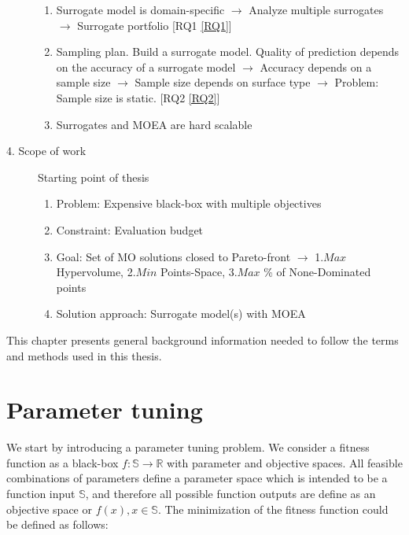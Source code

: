 \begin{blockquote}
\begin{description}
\begin{enumerate}
                    \item Surrogate model is domain-specific $\rightarrow$ Analyze multiple surrogates $\rightarrow$ Surrogate portfolio [RQ1 \ref{RQ1}]
                    \item Sampling plan. Build a surrogate model. Quality of prediction depends on the accuracy of a surrogate model  $\rightarrow$ Accuracy depends on a sample size $\rightarrow$ Sample size depends on surface type $\rightarrow$ Problem: Sample size is static. [RQ2 \ref{RQ2}]
                    \item Surrogates and MOEA are hard scalable 
                \end{enumerate}
            \item[4. Scope of work] Starting point of thesis
                \begin{enumerate}
                    \item Problem: Expensive black-box with multiple objectives
                    \item Constraint: Evaluation budget
                    \item Goal: Set of MO solutions closed to Pareto-front $\rightarrow$ 1.$Max$ Hypervolume, 2.$Min$ Points-Space, 3.$Max$ \% of None-Dominated points 
                    \item Solution approach: Surrogate model(s) with MOEA
                \end{enumerate}
        \end{description}
    \end{blockquote}

    This chapter presents general background information needed to follow the terms and methods used in this thesis. 

    \section{Parameter tuning}
        We start by introducing a parameter tuning problem. We consider a fitness function as a black-box $f : \mathbb{S} \rightarrow \mathbb{R}$ with parameter and objective spaces. All feasible combinations of parameters define a parameter space which is intended to be a function input $\mathbb{S}$, and therefore all possible function outputs are define as an objective space or $f(x), x \in \mathbb{S}$. The minimization of the fitness function could be defined as follows:

